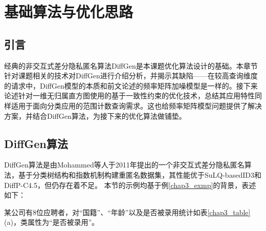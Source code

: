 
\raggedbottom
\chapter{基础算法与优化思路}
\label{chap:algorithm}

\section{引言}
经典的非交互式差分隐私匿名算法DiffGen是本课题优化算法设计的基础。本章节针对课题相关的技术对DiffGen进行介绍分析，并揭示其缺陷——在较高查询维度的请求中，DiffGen模型的本质和前文论述的频率矩阵加噪模型是一样的。接下来论述针对一维无归属直方图使用的基于一致性约束的优化技术，总结其应用特性同样适用于面向分类应用的范围计数查询需求。这也给频率矩阵模型问题提供了解决方案，并结合DiffGen算法，为接下来的优化算法做铺垫。

\section{DiffGen算法}

DiffGen算法是由Mohammed等人于2011年提出的一个非交互式差分隐私匿名算法\cite{DiffGen}，基于分类树结构和指数机制构建重匿名数据集，其性能优于SuLQ-basedID3和DiffP-C4.5，但仍存在着不足。
本节的示例均基于例\ref{chap3_exmp}的背景，表述如下：
\begin{exmp}
	\label{chap3_exmp}
	某公司有8位应聘者，对“国籍”、“年龄”以及是否被录用统计如表\ref{chap3_table}(a)，类属性为“是否被录用”。
\end{exmp}

